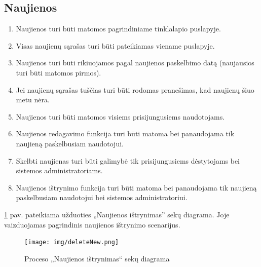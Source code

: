 \documentclass{VUMIFPSkursinis}
\begin{document}
\subsection{Naujienos}
\begin{enumerate}[label=FR5.\arabic*] 
	\item Naujienos turi būti matomos pagrindiniame tinklalapio puslapyje.
	\item Visas naujienų sąrašas turi būti pateikiamas viename puslapyje.
	\item Naujienos turi būti rikiuojamos pagal naujienos paskelbimo datą (naujausios turi būti matomos pirmos).
	\item Jei naujienų sąrašas tuščias turi būti rodomas pranešimas,
	kad naujienų šiuo metu nėra.
	\item Naujienos turi būti matomos visiems prisijungusiems naudotojams.
	\item Naujienos redagavimo funkcija turi būti matoma bei panaudojama tik naujieną paskelbusiam naudotojui.
	\item Skelbti naujienas turi būti galimybė tik prisijungusiems dėstytojams bei sistemos administratoriams.
	\item Naujienos ištrynimo funkcija turi būti matoma bei panaudojama tik naujieną paskelbusiam naudotojui bei sistemos administratoriui.\newline
\end{enumerate}

\ref{fig:delnews} pav. pateikiama užduoties „Naujienos ištrynimas” sekų diagrama. Joje vaizduojamas pagrindinis
naujienos ištrynimo scenarijus.
\begin{figure}[H]
	\centering
	\texttt{[image: img/deleteNew.png]}
	\caption{Proceso „Naujienos ištrynimas“ sekų diagrama}
	\label{fig:delnews}
\end{figure}
\end{document}
